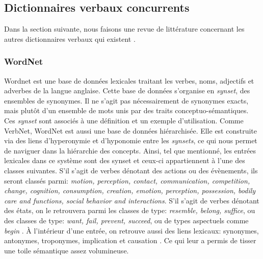 \subsection{Dictionnaires verbaux concurrents}

Dans la section suivante, nous faisons une revue de littérature concernant les autres dictionnaires verbaux qui existent . 

\subsubsection{WordNet}
Wordnet est une base de données lexicales traitant les verbes, noms, adjectifs et adverbes de la langue anglaise. Cette base de données s'organise en \emph{synset}, des ensembles de synonymes. Il ne s'agit pas nécessairement de synonymes exacts, mais plutôt d'un ensemble de mots  unis par des traits conceptuo-sémantiques. Ces \emph{synset} sont associés à une définition et un exemple d'utilisation. Comme VerbNet, WordNet est aussi une base de données hiérarchisée. Elle est construite via des liens d'hyperonymie et d'hyponomie entre les \emph{synsets}, ce qui nous permet de naviguer dans la hiérarchie des concepts. Ainsi, tel que mentionné, les entrées lexicales dans ce système sont des synset et ceux-ci appartiennent à l'une des classes suivantes. S'il s'agit de verbes dénotant des actions ou des évènements, ils seront classés parmi: \emph{ motion, perception, contact, communication, competition, change, cognition, consumption, creation, emotion, perception, possession, bodily care and functions, social behavior and interactions}. S'il s'agit de verbes dénotant des états, on le retrouvera parmi les classes de type: \emph{resemble, belong, suffice}, ou des classes de type: \emph{want, fail, prevent, succeed}, ou de types aspectuels comme \emph{begin} \citep{Fellbaum1998}. À l'intérieur d'une entrée, on retrouve aussi des liens lexicaux: synonymes, antonymes, troponymes, implication et causation \citep{SchulerVerbnetBroadcoverageComprehensive2005}. Ce qui leur a permis de tisser une toile sémantique assez volumineuse.

